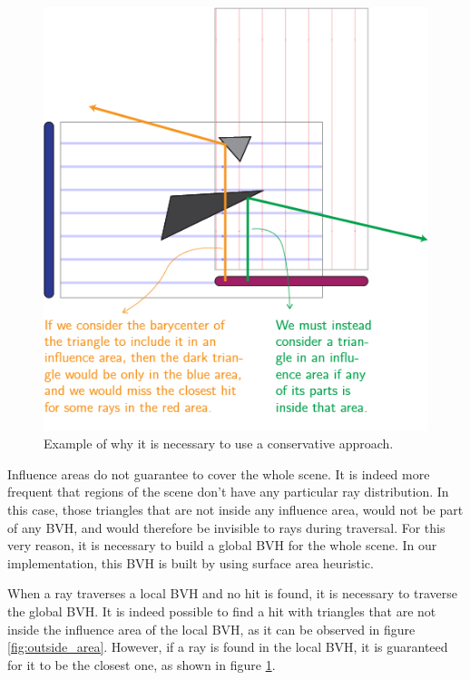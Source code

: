\documentclass{PoliMi_MasterThesis}
\begin{document}
\begin{figure}[H]
    \centering
    \includegraphics[width=\textwidth*\real{0.55}]{Images/double_area.png}
    \caption{Example of why it is necessary to use a conservative approach.}
    \label{fig:conservative_inside}
\end{figure}

Influence areas do not guarantee to cover the whole scene. It is indeed more frequent that regions of the scene don't have any particular ray distribution. In this case, those triangles that are not inside any influence area, would not be part of any BVH, and would therefore be invisible to rays during traversal. For this very reason, it is necessary to build a global BVH for the whole scene. In our implementation, this BVH is built by using surface area heuristic.

When a ray traverses a local BVH and no hit is found, it is necessary to traverse the global BVH. It is indeed possible to find a hit with triangles that are not inside the influence area of the local BVH, as it can be observed in figure \ref{fig:outside_area}. However, if a ray is found in the local BVH, it is guaranteed for it to be the closest one, as shown in figure \ref{fig:conservative_inside}.
\end{document}
